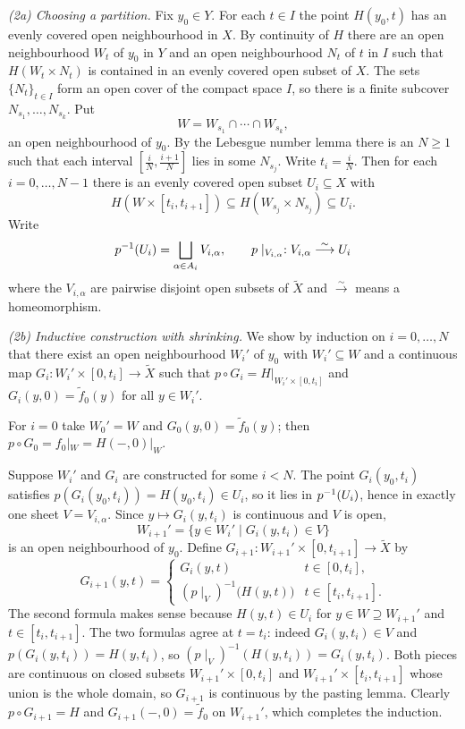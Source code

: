 \documentclass{article}
\begin{document}
\emph{(2a) Choosing a partition.} Fix $ y_0\in Y $. For each $ t\in I $ the point $ H(y_0,t) $ has an evenly covered open neighbourhood in $ X $. By continuity of $ H $ there are an open neighbourhood $ W_t $ of $ y_0 $ in $ Y $ and an open neighbourhood $ N_t $ of $ t $ in $ I $ such that $ H(W_t\times N_t) $ is contained in an evenly covered open subset of $ X $. The sets $ \{N_t\}_{t\in I} $ form an open cover of the compact space $ I $, so there is a finite subcover $ N_{s_1},\dots,N_{s_k} $. Put
\[
	W = W_{s_1}\cap\cdots\cap W_{s_k},
\]
an open neighbourhood of $ y_0 $. By the Lebesgue number lemma there is an $ N\ge 1 $ such that each interval $ [\frac iN,\frac{i+1}N] $ lies in some $ N_{s_j} $. Write $ t_i=\frac iN $. Then for each $ i=0,\dots,N-1 $ there is an evenly covered open subset $ U_i\subseteq X $ with
\[
	H\left(W\times[t_i,t_{i+1}]\right)\subseteq H(W_{s_j}\times N_{s_j})\subseteq U_i .
\]
Write
\[
	{p}^{-1}(U_i) = \bigsqcup_{\alpha\in A_i} V_{i,\alpha}, \qquad p\mid_{V_{i,\alpha}}:V_{i,\alpha} \overset{\sim}{\longrightarrow} U_i
\]
where the $ V_{i,\alpha} $ are pairwise disjoint open subsets of $ \tilde X $ and $ \overset\sim\longrightarrow $ means a homeomorphism.
\par
\emph{(2b) Inductive construction with shrinking.} We show by induction on $ i=0,\dots,N $ that there exist an open neighbourhood $ W_i' $ of $ y_0 $ with $ W_i'\subseteq W $ and a continuous map $ G_i:W_i'\times[0,t_i]\to\tilde X $ such that $ p\circ G_i=H|_{W_i'\times[0,t_i]} $ and $ G_i(y,0)=\tilde f_0(y) $ for all $ y\in W_i' $.
\par
For $ i=0 $ take $ W_0'=W $ and $ G_0(y,0)=\tilde f_0(y) $; then $ p\circ G_0=f_0|_W=H(-,0)|_W $.
\par
Suppose $ W_i' $ and $ G_i $ are constructed for some $ i<N $. The point $ G_i(y_0,t_i) $ satisfies $ p(G_i(y_0,t_i))=H(y_0,t_i)\in U_i $, so it lies in $ {p}^{-1}(U_i) $, hence in exactly one sheet $ V=V_{i,\alpha} $. Since $ y\mapsto G_i(y,t_i) $ is continuous and $ V $ is open,
\[
	W_{i+1}' = \{y\in W_i' \mid G_i(y,t_i)\in V\}
\]
is an open neighbourhood of $ y_0 $. Define $ G_{i+1}:W_{i+1}'\times[0,t_{i+1}]\to\tilde X $ by
\[
	G_{i+1}(y,t)=
	\begin{cases}
		G_i(y,t) & t\in[0,t_i],\\
		\left(p\mid_{V}\right)^{-1}\bigl(H(y,t)\bigr) & t\in[t_i,t_{i+1}].
	\end{cases}
\]
The second formula makes sense because $ H(y,t)\in U_i $ for $ y\in W\supseteq W_{i+1}' $ and $ t\in[t_i,t_{i+1}] $. The two formulas agree at $ t=t_i $: indeed $ G_i(y,t_i)\in V $ and $ p(G_i(y,t_i))=H(y,t_i) $, so $ \left(p\mid_V\right)^{-1}(H(y,t_i))=G_i(y,t_i)$. Both pieces are continuous on closed subsets $ W_{i+1}'\times[0,t_i] $ and $ W_{i+1}'\times[t_i,t_{i+1}] $ whose union is the whole domain, so $ G_{i+1} $ is continuous by the pasting lemma. Clearly $ p\circ G_{i+1}=H $ and $ G_{i+1}(-,0)=\tilde f_0 $ on $ W_{i+1}' $, which completes the induction.
\end{document}
